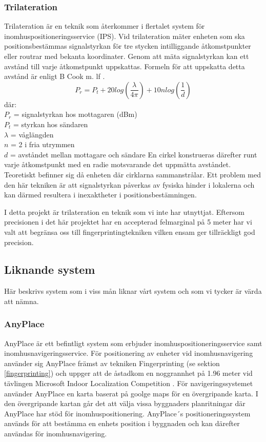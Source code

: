 \documentclass[swedish, a4paper,12pt]{article}
\begin{document}
\subsubsection{Trilateration}\label{triangulering}
Trilateration är en teknik som återkommer i flertalet system för inomhuspositioneringsservice (IPS). Vid trilateration mäter enheten som ska positionsbestämmas signalstyrkan för tre stycken intilliggande åtkomstpunkter eller routrar med bekanta koordinater. Genom att mäta signalstyrkan kan ett avstånd till varje åtkomstpunkt uppskattas. Formeln för att uppskatta detta avstånd är enligt B Cook m. lf \cite{cook2005indoor}.
\newline
$$ P_r = P_t + 20log(\frac{\lambda}{4\pi}) + 10nlog(\frac{1}{d})$$
där:\\
$  P_r $ = signalstyrkan hos mottagaren (dBm)\\
$P_t$ = styrkan hos sändaren\\
$\lambda$ = våglängden\\
$ n $ = 2 i fria utrymmen\\ %
$ d $ = avståndet mellan mottagare och sändare
\bigskip
\newline
En cirkel konstrueras därefter runt varje åtkomstpunkt med en radie motsvarande det uppmätta avståndet. %
Teoretiskt befinner sig då enheten där cirklarna sammanstrålar. Ett problem med den här tekniken är att signalstyrkan påverkas av fysiska hinder i lokalerna och kan därmed resultera i inexaktheter i positionsbestämningen.

I detta projekt är trilateration en teknik som vi inte har utnyttjat. Eftersom precisionen i det här projektet har en accepterad felmarginal på 5 meter har vi valt att begränsa oss till fingerprintingtekniken vilken ensam ger tillräckligt god precision.

\subsection{Liknande system}
Här beskrivs system som i viss mån liknar vårt system och som vi tycker är värda att nämna.

\subsubsection{AnyPlace}
AnyPlace är ett befintligt system som erbjuder inomhuspositioneringsservice samt inomhusnavigeringsservice. För positionering av enheter vid inomhusnavigering använder sig AnyPlace främst av tekniken Fingerprinting (se sektion \ref{fingerprinting}) och uppger att de åstadkom en noggrannhet på 1.96 meter vid tävlingen Microsoft Indoor Localization Competition \cite{anyplace}
\cite{IPS_tavling}.
För navigeringssystemet använder AnyPlace en karta baserat på goolge maps för en övergripande karta. I den övergripande kartan går det att välja vissa byggnaders planritningar där AnyPlace har stöd för inomhuspositionering. AnyPlace´s positioneringssystem används för att bestämma en enhets position i byggnaden och kan därefter användas för inomhusnavigering.
\end{document}
